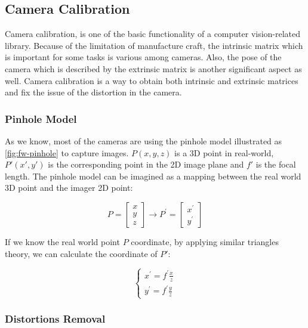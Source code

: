 \subsection{Camera Calibration}
\label{sec:Impl-fw-app-calib}

Camera calibration, is one of the basic functionality of a computer vision-related library. Because of the limitation of manufacture craft, the intrinsic
matrix which is important for some tasks is various among cameras. Also, the
pose of the camera which is described by the extrinsic matrix is another
significant aspect as well. Camera calibration is a way to obtain both
intrinsic and extrinsic matrices and fix the issue of the distortion in the camera.

\subsubsection{Pinhole Model}

As we know, most of the cameras are using the pinhole model illustrated as
\autoref{fig:fw-pinhole} to capture images. $P(x, y, z)$ is a 3D point in real-world, $P'(x', y')$ is the corresponding point in the 2D image plane and $f'$
is the focal length.
The pinhole model can be imagined as a mapping between the real world 3D point
and the imager 2D point:

\begin{equation}
P=\left[ \begin{array}{l}{x} \\ {y} \\ {z}\end{array}\right] \rightarrow
P^{\prime}=\left[ \begin{array}{l}{x^{\prime}} \\ {y^{\prime}}\end{array}\right]
\end{equation}

If we know the real world point $P$ coordinate, by applying similar triangles
theory, we can calculate the coordinate of $P'$:

\begin{equation}
\label{eq:pinhold-cartes}
\left\{\begin{array}{l}{x^{\prime}=f^{\prime} \frac{x}{z}} \\
{y^{\prime}=f^{\prime} \frac{y}{z}}\end{array}\right.
\end{equation}


\subsubsection{Distortions Removal}

